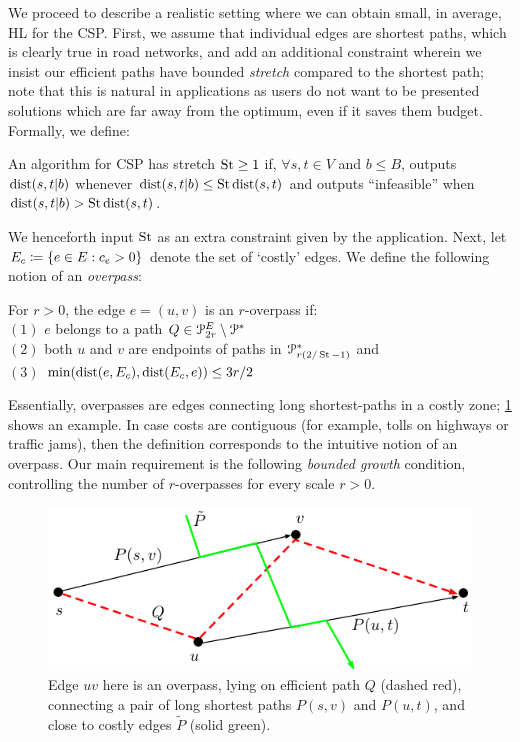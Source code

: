 We proceed to describe a realistic setting where we can obtain small, in average, HL for the CSP.
First, we assume that individual edges are shortest paths, which is clearly true in road networks, and add an additional constraint wherein we insist our efficient paths have bounded \emph{stretch} compared to the shortest path; note that this is natural in applications as users do not want to be presented solutions which are far away from the optimum, even if it saves them budget.
Formally, we define:

\begin{definition}[Stretch]
	An algorithm for CSP has stretch $\operatorname{St}\geq 1$ if, $\forall s,t\in V$ and $b\leq B$, outputs $\mbox{dist}(s,t|b)$ whenever $\mbox{dist}(s,t|b)\leq \operatorname{St}\mbox{dist}(s,t)$ and outputs ``infeasible'' when $\mbox{dist}(s,t|b)>\operatorname{St}\mbox{dist}(s,t)$.
\end{definition}
We henceforth input $\operatorname{St}$ as an extra constraint given by the application. 
Next, let $E_c\coloneqq\{e\in E:c_e>0\}$ denote the set of `costly' edges.
We define the following notion of an \emph{overpass}:

\begin{definition}[Overpass]
For $r>0$, the edge $e=(u,v)$ is an $r$-overpass if:\\
$(1)$ $e$ belongs to a path $Q\in\mathcal{P}^E_{2r}\setminus\mathcal{P}^*$\\
$(2)$ both $u$ and $v$ are endpoints of paths in $\mathcal{P}^*_{r(2/\operatorname{St}-1)}$ and\\ 
$(3)$ $\min(\mbox{dist}(e,E_c),\mbox{dist}(E_c,e))\leq 3r/2$
\end{definition} 
Essentially, overpasses are edges connecting long shortest-paths in a costly zone; \cref{fig:overpass} shows an example. In case costs are contiguous (for example, tolls on highways or traffic jams), then the definition corresponds to the intuitive notion of an overpass.
Our main requirement is the following \emph{bounded growth} condition, controlling the number of $r$-overpasses for every scale $r>0$.

\begin{figure}[!b]
	\centering
	\includegraphics[scale=0.7]{TexImg/overpass.pdf}
	\caption{Edge $uv$ here is an overpass, lying on efficient path $Q$ (dashed red), connecting a pair of long shortest paths $P(s,v)$ and $P(u,t)$, and close to costly edges $\tilde P$ (solid green). } 
	\label{fig:overpass}
\end{figure}


